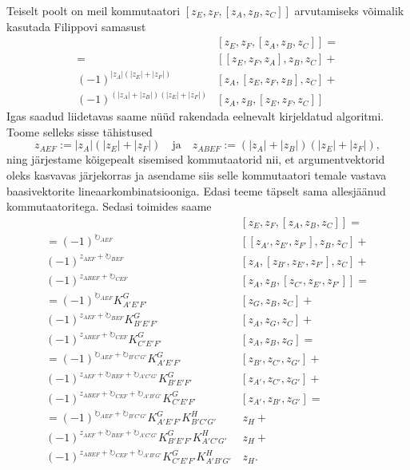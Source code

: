 Teiselt poolt on meil kommutaatori $\left[ z_E, z_F, [z_A, z_B, z_C] \right]$
arvutamiseks võimalik kasutada Filippovi samasust
\begin{align*}
    &\left[ z_E, z_F, [z_A, z_B, z_C] \right] = \\
    = &\left[[z_E, z_F, z_A], z_B, z_C\right] + \\
    (-1)^{|z_A|(|z_E|+|z_F|)}
        &\left[z_A, [z_E, z_F, z_B], z_C \right] + \\
    (-1)^{(|z_A|+|z_B|)(|z_E|+|z_F|)}
        &\left[z_A, z_B, [z_E, z_F, z_C] \right]
\end{align*}
Igas saadud liidetavas saame nüüd rakendada eelnevalt kirjeldatud algoritmi.
Toome selleks sisse tähistused
\[
    z_{AEF} := |z_A|(|z_E|+|z_F|)
    \quad \text{ja} \quad
    z_{ABEF} := (|z_A|+|z_B|)(|z_E|+|z_F|),
\]
ning järjestame kõigepealt sisemised kommutaatorid nii, et argumentvektorid
oleks kasvavas järjekorras ja asendame siis selle kommutaatori temale vastava
baasivektorite lineaarkombinatsiooniga. Edasi teeme täpselt sama allesjäänud
kommutaatoritega. Sedasi toimides saame
\begin{align*}
    &\left[ z_E, z_F, [z_A, z_B, z_C] \right] = \\
    = (-1)^{\circlearrowright_{AEF}}
        &\left[ [z_{A'}, z_{E'}, z_{F'}], z_B, z_C \right] + \\
    (-1)^{z_{AEF} + \circlearrowright_{BEF}}
        &\left[ z_A, [z_{B'}, z_{E'}, z_{F'}], z_C \right] + \\
    (-1)^{z_{ABEF} + \circlearrowright_{CEF}}
        &\left[ z_A, z_B, [z_{C'}, z_{E'}, z_{F'}] \right] = \\
    = (-1)^{\circlearrowright_{AEF}} K_{A' E' F'}^G
        &\left[ z_G, z_B, z_C \right] + \\
    (-1)^{z_{AEF} + \circlearrowright_{BEF}} K_{B' E' F'}^G
        &\left[ z_A, z_G, z_C \right] + \\
    (-1)^{z_{ABEF} + \circlearrowright_{CEF}} K_{C' E' F'}^G
        &\left[ z_A, z_B, z_G \right] = \\
    = (-1)^{\circlearrowright_{AEF} + \circlearrowright_{B'C'G'}}
        K_{A' E' F'}^G
        &\left[ z_{B'}, z_{C'}, z_{G'} \right] + \\
    (-1)^{z_{AEF} + \circlearrowright_{BEF} + \circlearrowright_{A'C'G'}}
        K_{B' E' F'}^G
        &\left[ z_{A'}, z_{C'}, z_{G'} \right] + \\
    (-1)^{z_{ABEF} + \circlearrowright_{CEF} + \circlearrowright_{A'B'G'}}
        K_{C' E' F'}^G
        &\left[ z_{A'}, z_{B'}, z_{G'} \right] = \\
    = (-1)^{\circlearrowright_{AEF} + \circlearrowright_{B'C'G'}}
        K_{A' E' F'}^G K_{B' C' G'}^H
        &\,z_H + \\
    (-1)^{z_{AEF} + \circlearrowright_{BEF} + \circlearrowright_{A'C'G'}}
        K_{B' E' F'}^G K_{A' C' G'}^H
        &\,z_H + \\
    (-1)^{z_{ABEF} + \circlearrowright_{CEF} + \circlearrowright_{A'B'G'}}
        K_{C' E' F'}^G K_{A' B' G'}^H
        &\,z_H.
\end{align*}


